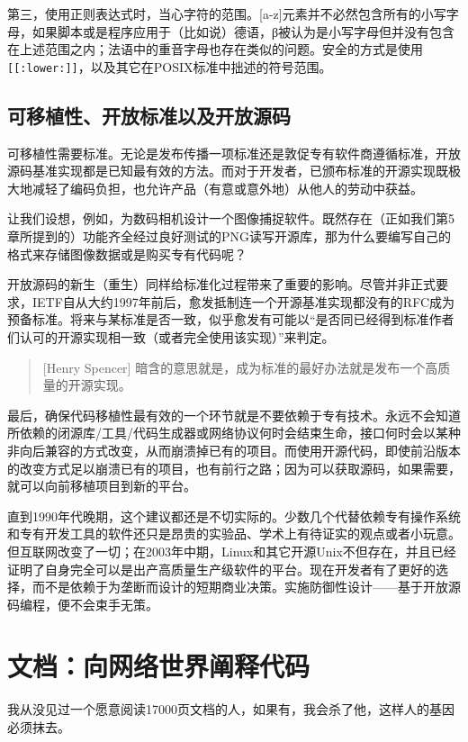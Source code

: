 \documentclass[12pt,oneside]{book}
\begin{document}
\begin{common-format}
第三，使用正则表达式时，当心字符的范围。[a-z]元素并不必然包含所有的小写字母，如果脚本或是程序应用于（比如说）德语，β被认为是小写字母但并没有包含在上述范围之内；法语中的重音字母也存在类似的问题。安全的方式是使用\verb+[[:lower:]]+，以及其它在POSIX标准中拙述的符号范围。

\section{可移植性、开放标准以及开放源码}
可移植性需要标准。无论是发布传播一项标准还是敦促专有软件商遵循标准，开放源码基准实现都是已知最有效的方法。而对于开发者，已颁布标准的开源实现既极大地减轻了编码负担，也允许产品（有意或意外地）从他人的劳动中获益。

让我们设想，例如，为数码相机设计一个图像捕捉软件。既然存在（正如我们第5章所提到的）功能齐全经过良好测试的PNG读写开源库，那为什么要编写自己的格式来存储图像数据或是购买专有代码呢？

开放源码的新生（重生）同样给标准化过程带来了重要的影响。尽管并非正式要求，IETF自从大约1997年前后，愈发抵制连一个开源基准实现都没有的RFC成为预备标准。将来与某标准是否一致，似乎愈发有可能以“是否同已经得到标准作者们认可的开源实现相一致（或者完全使用该实现）”来判定。

\begin{quote}[Henry Spencer]
暗含的意思就是，成为标准的最好办法就是发布一个高质量的开源实现。
\end{quote}

最后，确保代码移植性最有效的一个环节就是不要依赖于专有技术。永远不会知道所依赖的闭源库/工具/代码生成器或网络协议何时会结束生命，接口何时会以某种非向后兼容的方式改变，从而崩溃掉已有的项目。而使用开源代码，即使前沿版本的改变方式足以崩溃已有的项目，也有前行之路；因为可以获取源码，如果需要，就可以向前移植项目到新的平台。

直到1990年代晚期，这个建议都还是不切实际的。少数几个代替依赖专有操作系统和专有开发工具的软件还只是昂贵的实验品、学术上有待证实的观点或者小玩意。但互联网改变了一切；在2003年中期，Linux和其它开源Unix不但存在，并且已经证明了自身完全可以是出产高质量生产级软件的平台。现在开发者有了更好的选择，而不是依赖于为垄断而设计的短期商业决策。实施防御性设计——基于开放源码编程，便不会束手无策。



\chapter{文档：向网络世界阐释代码}
\begin{flushright}
\begin{notecard}{28em}
我从没见过一个愿意阅读17000页文档的人，如果有，我会杀了他，这样人的基因必须抹去。


\end{notecard}
\end{flushright}
\end{common-format}
\end{document}
